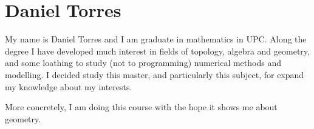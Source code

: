 \section{Daniel Torres}

My name is Daniel Torres and I am graduate in mathematics in UPC. Along the degree I have developed much interest in fields of topology, algebra and geometry, and some loathing to study (not to programming) numerical methods and modelling. I decided study this master, and particularly this subject, for expand my knowledge about my interests.

More concretely, I am doing this course with the hope it shows me about geometry.




